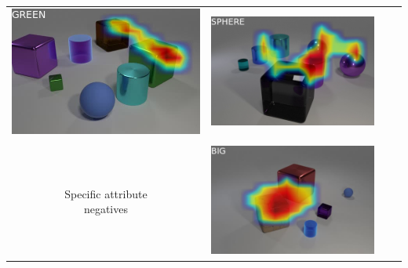 \begin{table}
\begin{tabular}{@{}cccc@{}}
\begin{minipage}{.2\textwidth}
      \includegraphics[width=\linewidth]{figures/CLEVR_activations/green_shape1.jpg}
    \end{minipage}
    &
    \begin{minipage}{.2\textwidth}
      \includegraphics[width=\linewidth]{figures/CLEVR_activations/sphere_color.png}
    \end{minipage}
\\ \\
\makecell{Specific attribute \\ negatives} &
    \begin{minipage}{.2\textwidth}
      \includegraphics[width=\linewidth]{figures/CLEVR_activations/big_size01.jpg}

\end{minipage}
\end{tabular}
\end{table}
